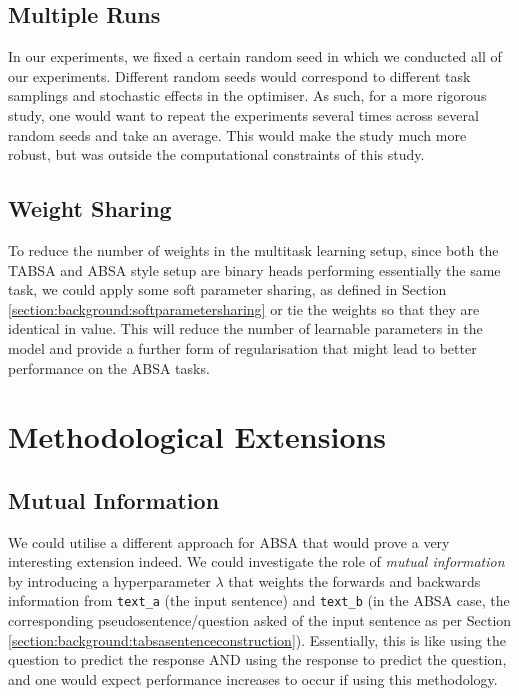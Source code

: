 \subsection{Multiple Runs}
In our experiments, we fixed a certain random seed in which we conducted all of our experiments. Different random seeds would correspond to different task samplings and stochastic effects in the optimiser. As such, for a more rigorous study, one would want to repeat the experiments several times across several random seeds and take an average. This would make the study much more robust, but was outside the computational constraints of this study.

\subsection{Weight Sharing}
To reduce the number of weights in the multitask learning setup, since both the TABSA and ABSA style setup are binary heads performing essentially the same task, we could apply some soft parameter sharing, as defined in Section \ref{section:background:softparametersharing} or tie the weights so that they are identical in value. This will reduce the number of learnable parameters in the model and provide a further form of regularisation that might lead to better performance on the ABSA tasks.

\section{Methodological Extensions}
\subsection{Mutual Information}
We could utilise a different approach for ABSA that would prove a very interesting extension indeed. We could investigate the role of \textit{mutual information} by introducing a hyperparameter $\lambda$ that weights the forwards and backwards information from \texttt{text\_a} (the input sentence) and \texttt{text\_b} (in the ABSA case, the corresponding pseudosentence/question asked of the input sentence as per Section \ref{section:background:tabsasentenceconstruction}). Essentially, this is like using the question to predict the response AND using the response to predict the question, and one would expect performance increases to occur if using this methodology.

